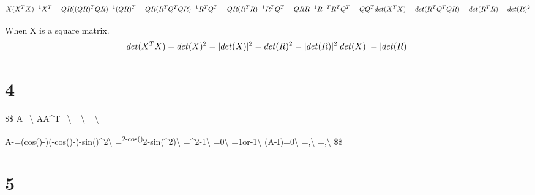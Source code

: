 \documentclass[
]{article}
\begin{document}
\[
X(X^T X)^{-1}X^T = QR((QR)^TQR)^{-1}(QR)^T\\
=QR(R^TQ^TQR)^{-1}R^TQ^T\\
=QR(R^TR)^{-1}R^TQ^T\\
=QRR^{-1}R^{-T}R^TQ^T\\
=QQ^T\\
det(X^TX)=det(R^TQ^TQR)=det(R^TR)=det(R)^2
\]

When X is a square matrix. \[
det(X^TX)=det(X)^2\\
=|det(X)|^2\\
=det(R)^2\\
=|det(R)|^2\\
|det(X)|=|det(R)|
\]

\hypertarget{section-3}{%
\section{4}\label{section-3}}

\$\$
A=\textbackslash{}
AA\^{}T=\textbackslash{}
=\textbackslash{}
=\textbackslash{}

\textbar A-\lambda\textbar=(cos(\theta)-\lambda)(-cos(\theta)-\lambda)-sin(\theta)\^{}2\textbackslash{}
=\lambda\textsuperscript{2-cos(\theta)}2-sin(\theta\^{}2)\textbackslash{}
=\lambda\^{}2-1\textbackslash{} =0\textbackslash{}
\lambda=1or-1\textbackslash{}
(A-\lambda I)=0\textbackslash{}
=,\textbackslash{}
=,\textbackslash{}
\$\$

\hypertarget{section-4}{%
\section{5}\label{section-4}}
\end{document}
